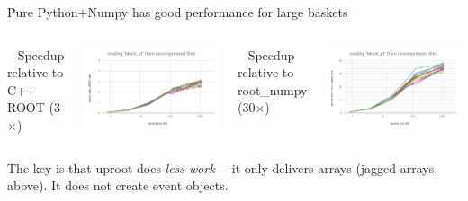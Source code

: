 \documentclass[aspectratio=169]{beamer}
\begin{document}
\begin{frame}{Pure Python+Numpy has good performance for large baskets}
\vspace{0.5 cm}

\begin{columns}
\mbox{ } \hfill Speedup relative to C++ ROOT (3$\times$) \hfill \mbox{ }

\includegraphics[width=\linewidth]{root-none-muon.png}

\mbox{ } \hfill Speedup relative to root\_numpy (30$\times$) \hfill \mbox{ }

\includegraphics[width=\linewidth]{rootnumpy-none-muon.png}
\end{columns}

\vspace{0.5 cm}
The key is that uproot does {\it less work---} it only delivers arrays (jagged arrays, above). It does not create event objects.
\end{frame}
\end{document}
